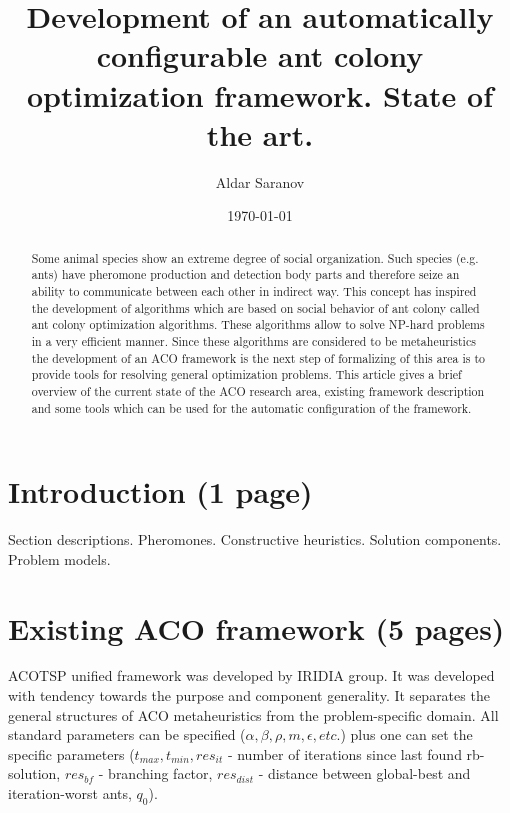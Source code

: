 \documentclass[12pt]{article}
\author{Aldar Saranov}
\date{\today}
\title{Development of an automatically configurable ant colony optimization framework. State of the art.}
\begin{document}
\maketitle 
\newpage

\tableofcontents
\newpage

\begin{abstract}
Some animal species show an extreme degree of social organization. Such species (e.g. ants) have pheromone production and detection body parts and therefore seize an ability to communicate between each other in indirect way. This concept has inspired the development of algorithms which are based on social behavior of ant colony called ant colony optimization algorithms. These algorithms allow to solve NP-hard problems in a very efficient manner. Since these algorithms are considered to be metaheuristics the development of an ACO framework is the next step of formalizing of this area is to provide tools for resolving general optimization problems. This article gives a brief overview of the current state of the ACO research area, existing framework description and some tools which can be used for the automatic configuration of the framework.
\end{abstract}




\section{Introduction (1 page)}
Section descriptions.
Pheromones.
Constructive heuristics.
Solution components.
Problem models.









\section{Existing ACO framework (5 pages)}

ACOTSP unified framework was developed by IRIDIA group. It was developed with tendency towards the purpose and component generality. It separates the general structures of ACO metaheuristics from the problem-specific domain. All standard parameters can be specified ($\alpha, \beta, \rho, m, \epsilon, etc.$) plus one can set the specific parameters ($t_{max}, t_{min}, res_{it}$ - number of iterations since last found rb-solution, $res_{bf}$ - branching factor, $res_{dist}$ - distance between global-best and iteration-worst ants, $q_0$).
\end{document}
